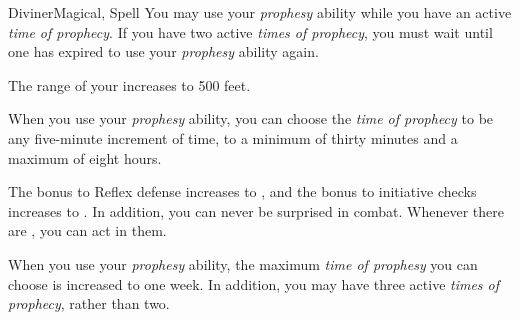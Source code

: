 \begin{feat}{Diviner}{Magical, Spell}
         You may use your \textit{prophesy} ability while you have an active \textit{time of prophecy}.
        If you have two active \textit{times of prophecy}, you must wait until one has expired to use your \textit{prophesy} ability again.

         The range of your  increases to 500 feet.

         When you use your \textit{prophesy} ability, you can choose the \textit{time of prophecy} to be any five-minute increment of time, to a minimum of thirty minutes and a maximum of eight hours.

         The bonus to Reflex defense increases to , and the bonus to initiative checks increases to .
        In addition, you can never be surprised in combat.
        Whenever there are , you can act in them.

         When you use your \textit{prophesy} ability, the maximum \textit{time of prophesy} you can choose is increased to one week.
        In addition, you may have three active \textit{times of prophecy}, rather than two.
    \end{feat}

